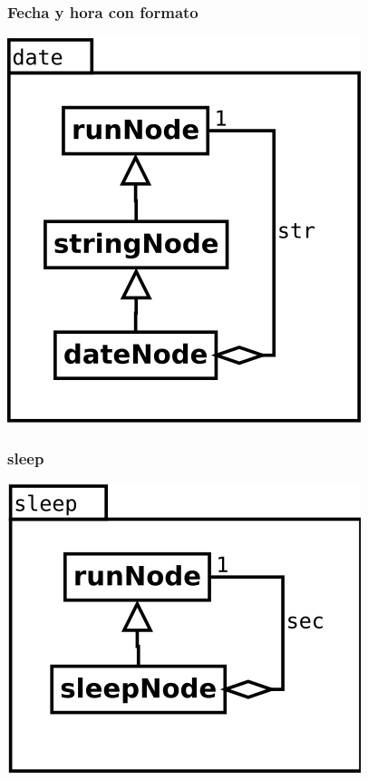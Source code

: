 \begin{multicols}{2}
   \subsubsection {Fecha y hora con formato} 
   \begin{center}
   \includegraphics[scale=0.4]{date.png} \\
   \end{center}

   \subsubsection {sleep} 
   \begin{center}
   \includegraphics[scale=0.4]{sleep.png} \\
   \end{center}
\end{multicols}

